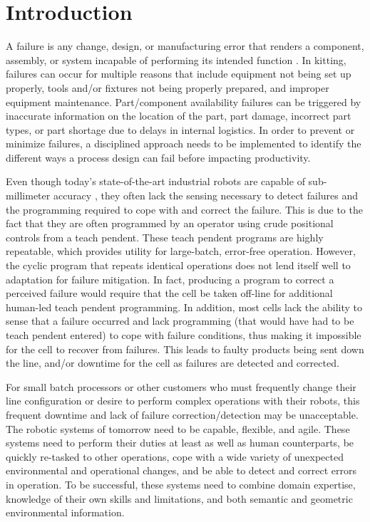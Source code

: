 \section{Introduction}
A failure is any change, design, or manufacturing error that renders a component, assembly, or system incapable of performing its intended function \cite{Collins93}. In kitting, failures can occur for multiple reasons that include equipment not being set up properly, tools and/or fixtures not being properly prepared, and improper equipment maintenance. Part/component availability failures can be triggered by inaccurate information on the location of the part, part damage, incorrect part types, or part shortage due to delays in internal logistics. In order to prevent or minimize failures, a disciplined approach needs to be implemented to identify the different ways a process design can fail before impacting productivity.

Even though today's state-of-the-art industrial robots are capable of sub-millimeter accuracy \cite{RobotAccuracy}, they often lack the sensing
necessary to detect failures and the programming required to cope with and correct the failure. This is due to the fact that they are often programmed
by an operator using crude positional controls from a teach pendent. These teach pendent programs are highly repeatable, which provides 
utility for large-batch, error-free operation. However, the cyclic program that repeats identical operations does not lend itself well to adaptation for 
failure mitigation. In fact, producing a program to correct a perceived failure would require that the cell be taken off-line
for additional human-led teach pendent programming. In addition, 
most cells lack the ability to sense that a failure occurred and  lack programming (that would have had to be teach pendent entered) to cope
with failure conditions, thus making it impossible for the cell to recover from failures.
This leads to faulty products being sent down the line, and/or downtime for the cell as failures are detected and corrected.

For small batch processors or other customers who must frequently change their line configuration or desire to perform complex operations
with their robots, this frequent downtime and lack of failure correction/detection may be unacceptable. The robotic systems of tomorrow need to be capable, flexible, and agile.  
These systems need to perform their duties at least  as well as human counterparts, be quickly re-tasked to other operations, cope with a wide 
variety of unexpected environmental and operational changes, and be able to detect and correct errors in operation. 
To be successful, these systems need to combine domain expertise, knowledge of their own skills and limitations, and both semantic and geometric 
environmental information.


